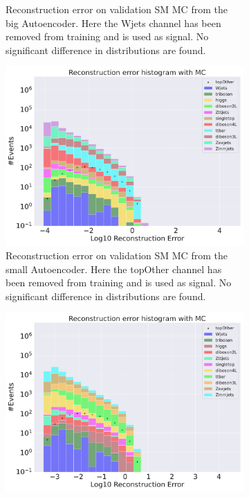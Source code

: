 \begin{figure}[h!]
\begin{subfigure}{.45\textwidth}
        \caption{Reconstruction error on validation SM MC from the big Autoencoder. Here the Wjets channel has been removed from training and 
        is used as signal. No significant difference in distributions are found. }
        \label{fig:ae_big_Wjets}
    \end{subfigure}
    \hfill 
    \begin{subfigure}{.45\textwidth}
        \includegraphics[width=\textwidth]{Figures/AE_testing/small/b_data_recon_big_rm3_feats_sig_topOther.pdf}
        \caption{Reconstruction error on validation SM MC from the small Autoencoder. Here the topOther channel has been removed from training and 
        is used as signal. No significant difference in distributions are found. }
        \label{fig:ae_small_topOther}
    \end{subfigure}
    \hfill
    \begin{subfigure}{.45\textwidth}
        \includegraphics[width=\textwidth]{Figures/AE_testing/big/b_data_recon_big_rm3_feats_sig_topOther.pdf}

\end{subfigure}
\end{figure}
